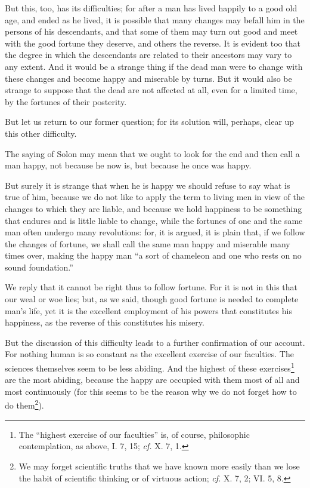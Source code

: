 But this, too, has its difficulties; for after a man has lived happily
to a good old age, and ended as he lived, it is possible that many
changes may befall him in the persons of his descendants, and that
some of them may turn out good and meet with the good fortune they
deserve, and others the reverse. It is evident too that the degree in
which the descendants are related to their ancestors may vary to any
extent. And it would be a strange thing if the dead man were to change
with these changes and become happy and miserable by turns. But it
would also be strange to suppose that the dead are not affected at
all, even for a limited time, by the fortunes of their posterity.

But let us return to our former question; for its solution will,
perhaps, clear up this other difficulty.

The saying of Solon may mean that we ought to look for the end and
then call a man happy, not because he now is, but because he once was
happy.

But surely it is strange that when he is happy we should refuse to say
what is true of him, because we do not like to apply the term to
living men in view  of the changes to which they are liable,
and because we hold happiness to be something that endures and is
little liable to change, while the fortunes of one and the same man
often undergo many revolutions: for, it is argued, it is plain that,
if we follow the changes of fortune, we shall call the same man happy
and miserable many times over, making the happy man ``a sort of
chameleon and one who rests on no sound foundation.''

We reply that it cannot be right thus to follow fortune. For it is not
in this that our weal or woe lies; but, as we said, though good
fortune is needed to complete man's life, yet it is the excellent
employment of his powers that constitutes his happiness, as the
reverse of this constitutes his misery.

But the discussion of this difficulty leads to a further confirmation
of our account. For nothing human is so constant as the excellent
exercise of our faculties. The sciences themselves seem to be less
abiding. And the highest of these exercises\footnote{The ``highest
exercise of our faculties'' is, of course, philosophic contemplation,
as above, I. 7, 15; \textit{cf.} X. 7, 1.} are the most abiding,
because the happy are occupied with them most of all and most
continuously (for this seems to be the reason why we do not forget how
to do them\footnote{We may forget scientific truths that we have
known more easily than we lose the habit of scientific thinking or of
virtuous action; \textit{cf.} X. 7, 2; VI. 5, 8.}).

